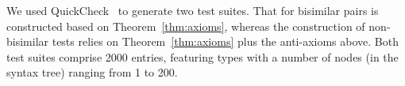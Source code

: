 
We used QuickCheck~\cite{DBLP:conf/icfp/ClaessenH00} to generate two
test suites. That for bisimilar pairs is constructed based on
Theorem~\ref{thm:axioms}, whereas the construction of non-bisimilar
tests relies on Theorem~\ref{thm:axioms} plus the anti-axioms
above. Both test suites comprise 2000 entries, featuring types with a
number of nodes (in the syntax tree) ranging from 1 to 200.



